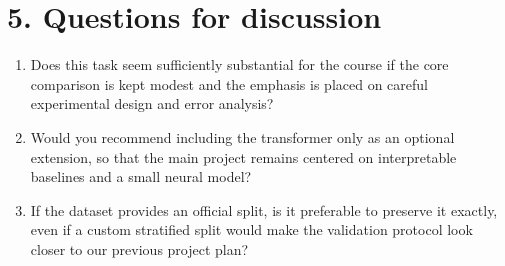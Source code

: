 \documentclass[11pt]{article}
\begin{document}
\section*{5. Questions for discussion}
\begin{enumerate}[leftmargin=1.5em]
\item Does this task seem sufficiently substantial for the course if the core comparison is kept modest and the emphasis is placed on careful experimental design and error analysis?
\item Would you recommend including the transformer only as an optional extension, so that the main project remains centered on interpretable baselines and a small neural model?
\item If the dataset provides an official split, is it preferable to preserve it exactly, even if a custom stratified split would make the validation protocol look closer to our previous project plan?
\end{enumerate}
\end{document}
